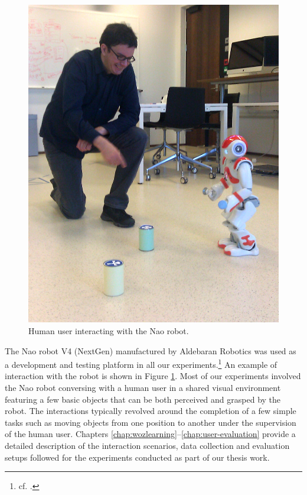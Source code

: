 \begin{figure}
\vspace{-6mm}
\centering 
\includegraphics[scale=0.1]{imgs/nao1.jpg}
\caption{Human user interacting with the Nao robot.}
\label{fig:nao}
\end{figure}

The Nao robot V4 (NextGen)  manufactured by Aldebaran Robotics was used as a development and testing platform in all our experiments.\footnote{cf.  .} An example of interaction with the robot is shown in Figure \ref{fig:nao}.  Most of our experiments involved the Nao robot conversing with a human user in a shared visual environment featuring a few basic objects that can be both perceived and grasped by the robot.  The interactions typically revolved around the completion of a few simple tasks such as moving objects from one position to another under the supervision of the human user. Chapters \ref{chap:wozlearning}--\ref{chap:user-evaluation} provide a detailed description of the interaction scenarios, data collection and evaluation setups followed for the experiments conducted as part of our thesis work. 

